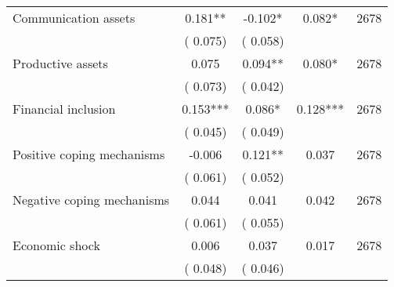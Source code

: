 \begin{tabular}{l*{4}{c}}
 Communication assets &              0.181** &        -0.102* &           0.082* & 2678                       \\  
                 &        (       0.075)                   &        (       0.058)                        &                                                             &                                                      \\      

 Productive assets &              0.075 &         0.094** &           0.080* & 2678                       \\  
                 &        (       0.073)                   &        (       0.042)                        &                                                             &                                                      \\      

 Financial inclusion &              0.153*** &         0.086* &           0.128*** & 2678                       \\  
                 &        (       0.045)                   &        (       0.049)                        &                                                             &                                                      \\      

 Positive coping mechanisms &             -0.006 &         0.121** &           0.037 & 2678                       \\  
                 &        (       0.061)                   &        (       0.052)                        &                                                             &                                                      \\      

 Negative coping mechanisms &              0.044 &         0.041 &           0.042 & 2678                       \\  
                 &        (       0.061)                   &        (       0.055)                        &                                                             &                                                      \\      

 Economic shock &              0.006 &         0.037 &           0.017 & 2678                       \\  
                 &        (       0.048)                   &        (       0.046)                        &                                                             &                                                      \\      


\end{tabular}

